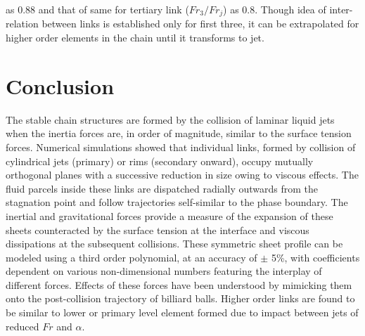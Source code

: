 \documentclass{jfm}
\begin{document}
as 0.88 and that of same for tertiary link ($Fr_3/Fr_j$) as 0.8. Though idea of inter-relation between links is established only for first three, it can be extrapolated for higher order elements in the chain until it transforms to jet.
\section{Conclusion}
The stable chain structures are formed by the collision of laminar liquid jets when the inertia forces are, in order of magnitude, similar to the surface tension forces. Numerical simulations showed that individual links, formed by collision of cylindrical jets (primary) or rims (secondary onward), occupy mutually orthogonal planes with a successive reduction in size owing to viscous effects. The fluid parcels inside these links are dispatched radially outwards from the stagnation point and follow trajectories self-similar to the phase boundary. The inertial and gravitational forces provide a measure of the expansion of these sheets counteracted by the surface tension at the interface and viscous dissipations at the subsequent collisions. These symmetric sheet profile can be modeled using a third order polynomial, at an accuracy of $\pm$ 5\%, with coefficients dependent on various non-dimensional numbers featuring the interplay of different forces. Effects of these forces have been understood by mimicking them onto the post-collision trajectory of billiard balls. Higher order links are found to be similar to lower or primary level element formed due to impact between jets of reduced $Fr$ and $\alpha$. 


\end{document}
